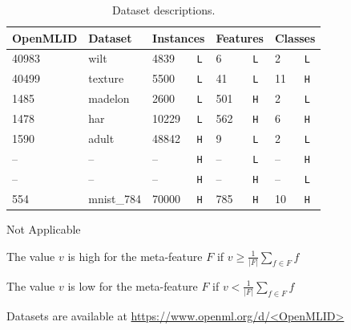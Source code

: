 \documentclass[5p,times]{elsarticle}
\begin{document}
\begin{table}[t]
    \caption{Dataset descriptions.}
    \footnotesize
    \label{tab:meta_features}
    \begin{threeparttable}
    \centering
        \begin{tabular}{ll|ll|ll|ll}
            \toprule
             \textbf{OpenMLID} \tnote{a} & \textbf{Dataset} & \multicolumn{2}{c}{\textbf{Instances}} & \multicolumn{2}{c}{\textbf{Features}} & \multicolumn{2}{c}{\textbf{Classes}}  \\ \midrule
             40983 & wilt & 4839 & \footnotesize{\texttt{L}} & 6 & \footnotesize{\texttt{L}} & 2 & \footnotesize{\texttt{L}}\\
             40499 & texture & 5500& \footnotesize{\texttt{L}} & 41& \footnotesize{\texttt{L}} & 11& \footnotesize{\texttt{H}}\\
             1485 & madelon & 2600 & \footnotesize{\texttt{L}} & 501 & \footnotesize{\texttt{H}} & 2 & \footnotesize{\texttt{L}}\\
             1478 & har & 10229 & \footnotesize{\texttt{L}} & 562& \footnotesize{\texttt{H}} & 6& \footnotesize{\texttt{H}}\\
             1590 & adult & 48842& \footnotesize{\texttt{H}} & 9& \footnotesize{\texttt{L}} & 2& \footnotesize{\texttt{L}}\\
             -- & -- & -- & \footnotesize{\texttt{H}} & -- & \footnotesize{\texttt{L}} & -- & \footnotesize{\texttt{H}}\\%
             -- & -- & -- & \footnotesize{\texttt{H}} & -- & \footnotesize{\texttt{H}} & -- & \footnotesize{\texttt{L}}\\%
             554 & mnist\_784 & 70000& \footnotesize{\texttt{H}} & 785& \footnotesize{\texttt{H}} & 10& \footnotesize{\texttt{H}}\\%
             \bottomrule
        \end{tabular}
        \label{tab:datasets}
        \begin{tablenotes}
            \item[--] {\scriptsize Not Applicable}
            \item[\texttt{H}] {\scriptsize The value $v$ is high for the meta-feature $F$ if $ v \geq \frac{1}{|F|}\sum_{f \in F} f$}
            \item[\texttt{L}] {\scriptsize The value $v$ is low for the meta-feature $F$ if $v < \frac{1}{|F|}\sum_{f \in F} f$}
            \item[a] {\scriptsize Datasets are available at \url{https://www.openml.org/d/<OpenMLID>}}
        \end{tablenotes}
    \end{threeparttable}
\end{table}
\end{document}
